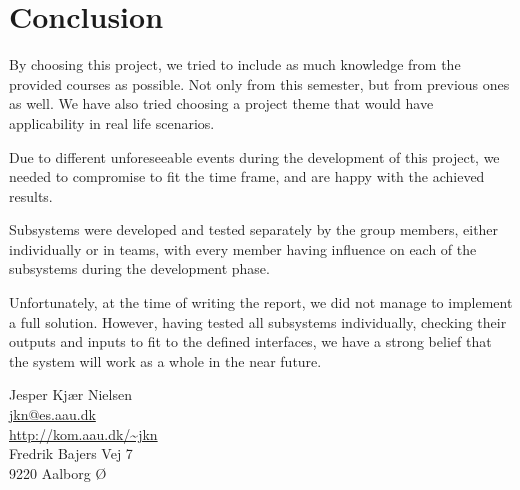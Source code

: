 \chapter{Conclusion}\label{ch:conclusion}

By choosing this project, we tried to include as much knowledge from the provided 
courses as possible. Not only from this semester, but from previous ones as well.
We have also tried choosing a project theme that would have applicability in real 
life scenarios.

Due to different unforeseeable events during the development of this project,
we needed to compromise to fit the time frame,
and are happy with the achieved results.

Subsystems were developed and tested separately by the group members,
either individually or in teams,
with every member having influence on each of the 
subsystems during the development phase.

Unfortunately, at the time of writing the report,
we did not manage to implement a full solution.
However, having tested all subsystems individually,
checking their outputs and inputs to fit to the defined interfaces,
we have a strong belief that the system will work as a whole in the near      future.



  \begin{center}
    Jesper Kjær Nielsen\\
    \href{mailto: jkn@es.aau.dk}{jkn@es.aau.dk}\\
    \href{http://kom.aau.dk/~jkn}{http://kom.aau.dk/\textasciitilde jkn}\\
    Fredrik Bajers Vej 7\\
    9220 Aalborg Ø
  \end{center}
